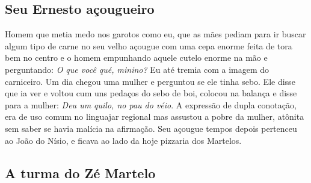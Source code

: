 \documentclass[12pt,brazil,]{book}
\begin{document}
\subsection{Seu Ernesto açougueiro}\label{seu-ernesto-auxe7ougueiro}

Homem que metia medo nos garotos como eu, que as mães pediam para ir
buscar algum tipo de carne no seu velho açougue com uma cepa enorme
feita de tora bem no centro e o homem empunhando aquele cutelo enorme na
mão e perguntando: \emph{O que você qué, minino? } Eu até tremia com a
imagem do carniceiro. Um dia chegou uma mulher e perguntou se ele tinha
sebo. Ele disse que ia ver e voltou cum uns pedaços do sebo de boi,
colocou na balança e disse para a mulher: \emph{Deu um quilo, no pau do
véio}. A expressão de dupla conotação, era de uso comum no linguajar
regional mas assustou a pobre da mulher, atônita sem saber se havia
malícia na afirmação. Seu açougue tempos depois pertenceu ao João do
Nísio, e ficava ao lado da hoje pizzaria dos Martelos.

\subsection{A turma do Zé Martelo}\label{a-turma-do-zuxe9-martelo}
\end{document}
